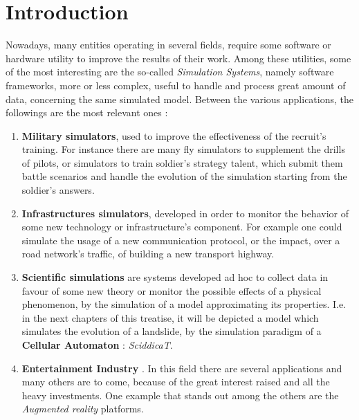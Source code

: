 \documentclass[12pt,a4paper,fleqn]{report}
\begin{document}
\chapter{Introduction}
Nowadays, many entities operating in several fields, require some software or hardware utility to improve the results of their work. Among these utilities, some of the most interesting are the so-called \textit{Simulation Systems}, namely software frameworks, more or less complex, useful to handle and process great amount of data, concerning the same simulated model. Between the various applications, the followings are the most relevant ones :
\begin{enumerate}
\item
\textbf{Military simulators}, used to improve the effectiveness of the recruit's training. For instance there are many fly simulators to supplement the drills of pilots, or simulators to train soldier's strategy talent, which submit them battle scenarios and handle the evolution of the simulation starting from the soldier's answers.
\item
\textbf{Infrastructures simulators}, developed in order to monitor the behavior of some new technology or infrastructure's component. For example one could simulate the usage of a new communication protocol, or the impact, over a road network's traffic, of building a new transport highway.
\item
\textbf{Scientific simulations} are systems developed ad hoc to collect data in favour of some new theory or monitor the possible effects of a physical phenomenon, by the simulation of a model approximating its properties. I.e. in the next chapters of this treatise, it will be depicted a model which simulates the evolution of a landslide, by the simulation paradigm of a\\ \textbf{Cellular Automaton} : \textit{SciddicaT}.
\item
\textbf{Entertainment Industry }. In this field there are several applications and many others are to come, because of the great interest raised and all the heavy investments. One example that stands out among the others are the \textit{Augmented reality} platforms.
\end{enumerate}
 
\end{document}
